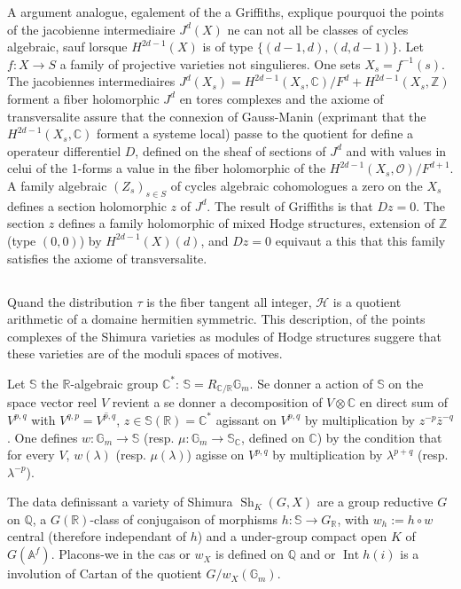 \documentclass[11pt,a4paper]{article}
\theoremstyle{plain}
\theoremstyle{definition}
\DeclareMathOperator{\Int}{Int}
\DeclareMathOperator{\Sh}{Sh}
\newcommand{\Q}{\mathbb{Q}}
\newcommand{\Z}{\mathbb{Z}}
\newcommand{\C}{\mathbb{C}}
\newcommand{\R}{\mathbb{R}}
\newcommand{\Af}{\mathbb{A}^f}
\begin{document}
A argument analogue, egalement of the a Griffiths, explique pourquoi the points of the jacobienne intermediaire $J^d(X)$ ne can not all be classes of cycles algebraic, sauf lorsque $H^{2d-1}(X)$ is of type $\{(d-1, d), (d, d-1)\}$. Let $f: X \to S$ a family of projective varieties not singulieres. One sets $X_s = f^{-1}(s)$. The jacobiennes intermediaires $J^d(X_s) = H^{2d-1}(X_s, \C) / F^d + H^{2d-1}(X_s, \Z)$ forment a fiber holomorphic $J^d$ en tores complexes and the axiome of transversalite assure that the connexion of Gauss-Manin (exprimant that the $H^{2d-1}(X_s, \C)$ forment a systeme local) passe to the quotient for define a operateur differentiel $D$, defined on the sheaf of sections of $J^d$ and with values in celui of the 1-forms a value in the fiber holomorphic of the $H^{2d-1}(X_s, \mathcal{O})/F^{d+1}$. A family algebraic $(Z_s)_{s \in S}$ of cycles algebraic cohomologues a zero on the $X_s$ defines a section holomorphic $z$ of $J^d$. The result of Griffiths is that $Dz = 0$. The section $z$ defines a family holomorphic of mixed Hodge structures, extension of $\Z$ (type $(0,0)$) by $H^{2d-1}(X)(d)$, and $Dz = 0$ equivaut a this that this family satisfies the axiome of transversalite.


\subsection{}

Quand the distribution $\tau$ is the fiber tangent all integer, $\mathscr{H}$ is a quotient arithmetic of a domaine hermitien symmetric. This description, of the points complexes of the Shimura varieties as modules of Hodge structures suggere that these varieties are of the moduli spaces of motives.

Let $\mathbb{S}$ the $\R$-algebraic group $\C^*$: $\mathbb{S} = R_{\C/\R} \mathbb{G}_m$. Se donner a action of $\mathbb{S}$ on the space vector reel $V$ revient a se donner a decomposition of $V \otimes \C$ en direct sum of $V^{p,q}$ with $V^{q,p} = \overline{V^{p,q}}$, $z \in \mathbb{S}(\R) = \C^*$ agissant on $V^{p,q}$ by multiplication by $z^{-p} \bar{z}^{-q}$. One defines $w: \mathbb{G}_m \to \mathbb{S}$ (resp. $\mu: \mathbb{G}_m \to \mathbb{S}_{\C}$, defined on $\C$) by the condition that for every $V$, $w(\lambda)$ (resp. $\mu(\lambda)$) agisse on $V^{p,q}$ by multiplication by $\lambda^{p+q}$ (resp. $\lambda^{-p}$).

The data definissant a variety of Shimura $\Sh_K(G, X)$ are a group reductive $G$ on $\Q$, a $G(\R)$-class of conjugaison of morphisms $h: \mathbb{S} \to G_{\R}$, with $w_h := h \circ w$ central (therefore independant of $h$) and a under-group compact open $K$ of $G(\Af)$. Placons-we in the cas or $w_X$ is defined on $\Q$ and or $\Int h(i)$ is a involution of Cartan of the quotient $G/w_X(\mathbb{G}_m)$.
\end{document}
